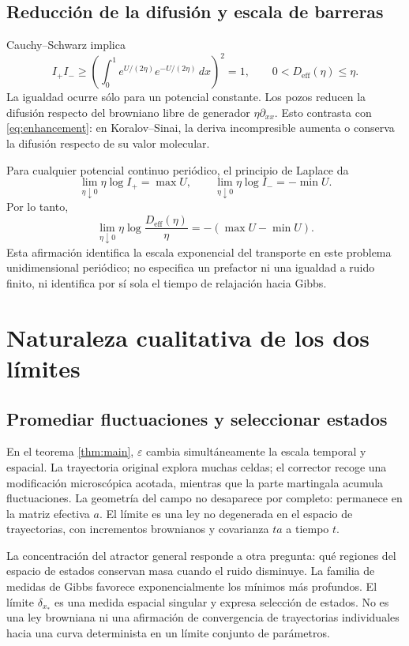 \documentclass[11pt,a4paper]{article}
\theoremstyle{remark}\newtheorem{remark}{Observación}
\newcommand{\Deff}{D_{\mathrm{eff}}}
\begin{document}
\subsection{Reducción de la difusión y escala de barreras}
Cauchy--Schwarz implica
\[
 I_+I_-\geq\left(\int_0^1e^{U/(2\eta)}e^{-U/(2\eta)}\,dx\right)^2=1,
 \qquad 0<\Deff(\eta)\leq\eta.
\]
La igualdad ocurre sólo para un potencial constante. Los pozos reducen la difusión respecto del browniano libre de generador $\eta\partial_{xx}$. Esto contrasta con \eqref{eq:enhancement}: en Koralov--Sinai, la deriva incompresible aumenta o conserva la difusión respecto de su valor molecular.

Para cualquier potencial continuo periódico, el principio de Laplace da
\[
 \lim_{\eta\downarrow0}\eta\log I_+=\max U,
 \qquad \lim_{\eta\downarrow0}\eta\log I_-=-\min U.
\]
Por lo tanto,
\begin{equation}\label{eq:barrier}
 \lim_{\eta\downarrow0}\eta\log\frac{\Deff(\eta)}{\eta}
 =-(\max U-\min U).
\end{equation}
Esta afirmación identifica la escala exponencial del transporte en este problema unidimensional periódico; no especifica un prefactor ni una igualdad a ruido finito, ni identifica por sí sola el tiempo de relajación hacia Gibbs.

\section{Naturaleza cualitativa de los dos límites}
\subsection{Promediar fluctuaciones y seleccionar estados}
En el teorema \ref{thm:main}, $\varepsilon$ cambia simultáneamente la escala temporal y espacial. La trayectoria original explora muchas celdas; el corrector recoge una modificación microscópica acotada, mientras que la parte martingala acumula fluctuaciones. La geometría del campo no desaparece por completo: permanece en la matriz efectiva $a$. El límite es una ley no degenerada en el espacio de trayectorias, con incrementos brownianos y covarianza $ta$ a tiempo $t$.

La concentración del atractor general responde a otra pregunta: qué regiones del espacio de estados conservan masa cuando el ruido disminuye. La familia de medidas de Gibbs favorece exponencialmente los mínimos más profundos. El límite $\delta_{x_*}$ es una medida espacial singular y expresa selección de estados. No es una ley browniana ni una afirmación de convergencia de trayectorias individuales hacia una curva determinista en un límite conjunto de parámetros.
\end{document}
